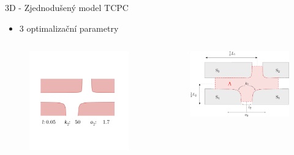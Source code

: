 \documentclass[aspectratio=169,xcolor=dvipsnames]{beamer}
\begin{document}
\begin{frame}{3D - Zjednodušený model TCPC}
	\addtocounter{framenumber}{-1}
	\begin{itemize}
		\item 3 optimalizační parametry
	\end{itemize}
	\begin{columns}
		\begin{column}{.58\textwidth}
			\begin{figure}
				\includegraphics[width=1.\linewidth, trim={5cm 6cm 8cm 19cm}, clip]{Images/d.png}		
			\end{figure}
		\end{column}
		\begin{column}{.42\textwidth}
			\vspace{-15mm}
			\begin{figure}
				\includegraphics[width=1.\linewidth, trim={0 0 0 0}, clip]{Images/krizovatka.pdf}		

\end{figure}
\end{column}
\end{columns}
\end{frame}
\end{document}
